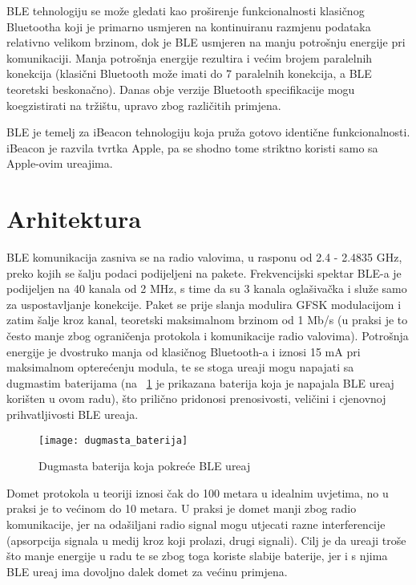 BLE tehnologiju se mo\v{z}e gledati kao pro\v{s}irenje funkcionalnosti klasi\v{c}nog Bluetootha koji je primarno usmjeren na kontinuiranu razmjenu podataka relativno velikom brzinom, dok je BLE usmjeren na manju potro\v{s}nju energije pri komunikaciji. Manja potro\v{s}nja energije rezultira i ve\'{c}im brojem paralelnih konekcija (klasi\v{c}ni Bluetooth mo\v{z}e imati do 7 paralelnih konekcija, a BLE teoretski beskona\v{c}no). Danas obje verzije Bluetooth specifikacije mogu koegzistirati na tr\v{z}i\v{s}tu, upravo zbog razli\v{c}itih primjena.

BLE je temelj za iBeacon tehnologiju koja pru\v{z}a gotovo identi\v{c}ne funkcionalnosti. iBeacon je razvila tvrtka Apple, pa se shodno tome striktno koristi samo sa Apple-ovim ure\dj ajima.

\section{Arhitektura}

BLE komunikacija zasniva se na radio valovima, u rasponu od 2.4 - 2.4835 GHz, preko kojih se \v{s}alju podaci podijeljeni na pakete. Frekvencijski spektar BLE-a je podijeljen na 40 kanala od 2 MHz, s time da su 3 kanala ogla\v{s}iva\v{c}ka i slu\v{z}e samo za uspostavljanje konekcije. Paket se prije slanja modulira GFSK modulacijom i zatim \v{s}alje kroz kanal, teoretski maksimalnom brzinom od 1 Mb/s (u praksi je to \v{c}esto manje zbog ograni\v{c}enja protokola i komunikacije radio valovima). Potro\v{s}nja energije je dvostruko manja od klasi\v{c}nog Bluetooth-a i iznosi 15 mA pri maksimalnom optere\'{c}enju modula, te se stoga ure\dj aji mogu napajati sa dugmastim baterijama (na ~\ref{fig:ble_baterija} je prikazana baterija koja je napajala BLE ure\dj aj kori\v{s}ten u ovom radu), \v{s}to prili\v{c}no pridonosi prenosivosti, veli\v{c}ini i cjenovnoj prihvatljivosti BLE ure\dj aja.


\begin{figure}[!htbp]
	\begin{center}
 \texttt{[image: dugmasta\_baterija]}
 \caption{Dugmasta baterija koja pokre\'{c}e BLE ure\dj aj}
 \label{fig:ble_baterija}
	\end{center}
\end{figure}

Domet protokola u teoriji iznosi \v{c}ak do 100 metara u idealnim uvjetima, no u praksi je to ve\'{c}inom do 10 metara. U praksi je domet manji zbog radio komunikacije, jer na oda\v{s}iljani radio signal mogu utjecati razne interferencije (apsorpcija signala u medij kroz koji prolazi, drugi signali). Cilj je da ure\dj aji tro\v{s}e \v{s}to manje energije u radu te se zbog toga koriste slabije baterije, jer i s njima BLE ure\dj aj ima dovoljno dalek domet za ve\'{c}inu primjena.


